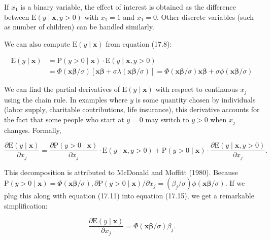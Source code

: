 \documentclass[10pt]{article}
\begin{document}
If $x_{1}$ is a binary variable, the effect of interest is obtained as the difference between $\mathrm{E}(y \mid \mathbf{x}, y>0)$ with $x_{1}=1$ and $x_{1}=0$. Other discrete variables (such as number of children) can be handled similarly.

We can also compute $\mathrm{E}(y \mid \mathbf{x})$ from equation (17.8):


\begin{align*}
\mathrm{E}(y \mid \mathbf{x}) & =\mathrm{P}(y>0 \mid \mathbf{x}) \cdot \mathrm{E}(y \mid \mathbf{x}, y>0) \\
& =\Phi(\mathbf{x} \boldsymbol{\beta} / \sigma)[\mathbf{x} \boldsymbol{\beta}+\sigma \lambda(\mathbf{x} \boldsymbol{\beta} / \sigma)]=\Phi(\mathbf{x} \boldsymbol{\beta} / \sigma) \mathbf{x} \boldsymbol{\beta}+\sigma \phi(\mathbf{x} \boldsymbol{\beta} / \sigma) \tag{17.14}
\end{align*}


We can find the partial derivatives of $\mathrm{E}(y \mid \mathbf{x})$ with respect to continuous $x_{j}$ using the chain rule. In examples where $y$ is some quantity chosen by individuals (labor supply, charitable contributions, life insurance), this derivative accounts for the fact that some people who start at $y=0$ may switch to $y>0$ when $x_{j}$ changes. Formally,


\begin{equation*}
\frac{\partial \mathrm{E}(y \mid \mathbf{x})}{\partial x_{j}}=\frac{\partial \mathrm{P}(y>0 \mid \mathbf{x})}{\partial x_{j}} \cdot \mathrm{E}(y \mid \mathbf{x}, y>0)+\mathrm{P}(y>0 \mid \mathbf{x}) \cdot \frac{\partial \mathrm{E}(y \mid \mathbf{x}, y>0)}{\partial x_{j}} . \tag{17.15}
\end{equation*}


This decomposition is attributed to McDonald and Moffitt (1980). Because $\mathrm{P}(y> 0 \mid \mathbf{x})=\Phi(\mathbf{x} \boldsymbol{\beta} / \sigma), \partial \mathrm{P}(y>0 \mid \mathbf{x}) / \partial x_{j}=\left(\beta_{j} / \sigma\right) \phi(\mathbf{x} \boldsymbol{\beta} / \sigma)$. If we plug this along with equation (17.11) into equation (17.15), we get a remarkable simplification:


\begin{equation*}
\frac{\partial \mathrm{E}(y \mid \mathbf{x})}{\partial x_{j}}=\Phi(\mathbf{x} \boldsymbol{\beta} / \sigma) \beta_{j} . \tag{17.16}
\end{equation*}
\end{document}
